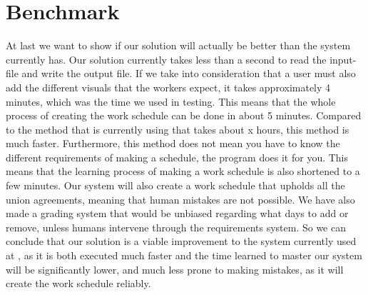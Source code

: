 \section{Benchmark}
At last we want to show if our solution will actually be better than the system \siemens currently has. Our solution currently takes less than a second to read the input-file and write the output file. If we take into consideration that a user must also add the different visuals that the workers expect, it takes approximately 4 minutes, which was the time we used in testing. This means that the whole process of creating the work schedule can be done in about 5 minutes. 
Compared to the method that \siemens is currently using that takes about x hours, this method is much faster. Furthermore, this method does not mean you have to know the different requirements of making a schedule, the program does it for you. This means that the learning process of making a work schedule is also shortened to a few minutes.
Our system will also create a work schedule that upholds all the union agreements, meaning that human mistakes are not possible. We have also made a grading system that would be unbiased regarding what days to add or remove, unless humans intervene through the requirements system.
So we can conclude that our solution is a viable improvement to the system currently used at \siemens, as it is both executed much faster and the time learned to master our system will be significantly lower, and much less prone to making mistakes, as it will create the work schedule reliably.

